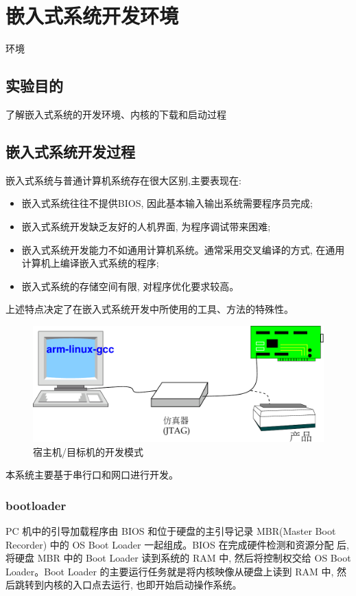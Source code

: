 \chapter{嵌入式系统开发环境}{环境}\label{ch-env}

\section{实验目的}
了解嵌入式系统的开发环境、内核的下载和启动过程

\section{嵌入式系统开发过程}
嵌入式系统与普通计算机系统存在很大区别,主要表现在:
\begin{itemize}
    \item 嵌入式系统往往不提供BIOS, 因此基本输入输出系统需要程序员完成;
    \item 嵌入式系统开发缺乏友好的人机界面, 为程序调试带来困难;
    \item 嵌入式系统开发能力不如通用计算机系统。通常采用交叉编译的方式,
        在通用计算机上编译嵌入式系统的程序;
    \item 嵌入式系统的存储空间有限, 对程序优化要求较高。
\end{itemize}
    上述特点决定了在嵌入式系统开发中所使用的工具、方法的特殊性。

\begin{figure}[h]
\centering
  \includegraphics[width=.55\textwidth]{host-obj}
\caption{宿主机/目标机的开发模式}
\end{figure}

    本系统主要基于串行口和网口进行开发。

\subsection{bootloader}
PC 机中的引导加载程序由 BIOS 和位于硬盘的主引导记录 MBR(Master Boot
Recorder) 中的 OS Boot Loader 一起组成。BIOS 在完成硬件检测和资源分配
后, 将硬盘 MBR 中的 Boot Loader 读到系统的 RAM 中, 然后将控制权交给
OS Boot Loader。Boot Loader 的主要运行任务就是将内核映像从硬盘上读到
RAM 中, 然后跳转到内核的入口点去运行, 也即开始启动操作系统。

